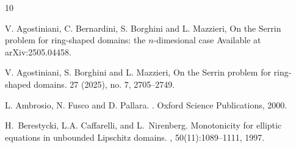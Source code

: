 \documentclass[10 pt,a4paper]{article}
\theoremstyle{definition}
\begin{document}
%
%
%
%
%
%
%








%

\begin{thebibliography}{10}

V. Agostiniani, C. Bernardini, S. Borghini and L. Mazzieri, 
\newblock On the Serrin problem for ring-shaped domains: the $n$-dimesional case
\newblock Available at arXiv:2505.04458.

V. Agostiniani, S. Borghini and L. Mazzieri, 
\newblock On the Serrin problem for ring-shaped domains.
 27 (2025), no. 7, 2705--2749.

% 


L. Ambrosio, N. Fusco and D. Pallara.
.
\newblock Oxford Science Publications, 2000.


H.~Berestycki, L.A. Caffarelli, and L.~Nirenberg.
\newblock Monotonicity for elliptic equations in unbounded {L}ipschitz domains.
, 50(11):1089--1111, 1997.


\end{thebibliography}
\end{document}
